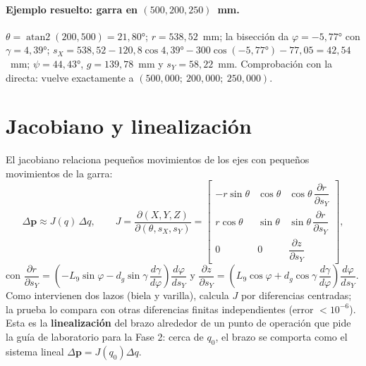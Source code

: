 \paragraph{Ejemplo resuelto: garra en $(500, 200, 250)$~mm.} $\theta = \operatorname{atan2}(200, 500) = 21{,}80°$; $r = 538{,}52$~mm; la bisección da $\varphi = -5{,}77°$ con $\gamma = 4{,}39°$; $s_X = 538{,}52 - 120{,}8\cos 4{,}39° - 300\cos(-5{,}77°) - 77{,}05 = 42{,}54$~mm; $\psi = 44{,}43°$, $g = 139{,}78$~mm y $s_Y = 58{,}22$~mm. Comprobación con la directa: vuelve exactamente a $(500{,}000;\ 200{,}000;\ 250{,}000)$.

\section{Jacobiano y linealización}\label{sec:jacobiano}
El jacobiano relaciona pequeños movimientos de los ejes con pequeños movimientos de la garra:
\[
\Delta\mathbf{p} \approx J(q)\,\Delta q, \qquad
J = \frac{\partial(X, Y, Z)}{\partial(\theta, s_X, s_Y)} =
\begin{bmatrix}
-r\sin\theta & \cos\theta & \cos\theta\,\dfrac{\partial r}{\partial s_Y}\\[6pt]
r\cos\theta & \sin\theta & \sin\theta\,\dfrac{\partial r}{\partial s_Y}\\[6pt]
0 & 0 & \dfrac{\partial z}{\partial s_Y}
\end{bmatrix},
\]
con $\dfrac{\partial r}{\partial s_Y} = \left(-L_9\sin\varphi - d_g\sin\gamma\,\dfrac{d\gamma}{d\varphi}\right)\dfrac{d\varphi}{ds_Y}$ y $\dfrac{\partial z}{\partial s_Y} = \left(L_9\cos\varphi + d_g\cos\gamma\,\dfrac{d\gamma}{d\varphi}\right)\dfrac{d\varphi}{ds_Y}$. Como intervienen dos lazos (biela y varilla),  calcula $J$ por diferencias centradas; la prueba lo compara con otras diferencias finitas independientes (error $< 10^{-6}$). Esta es la \textbf{linealización} del brazo alrededor de un punto de operación que pide la guía de laboratorio para la Fase 2: cerca de $q_0$, el brazo se comporta como el sistema lineal $\Delta\mathbf{p} = J(q_0)\Delta q$.

